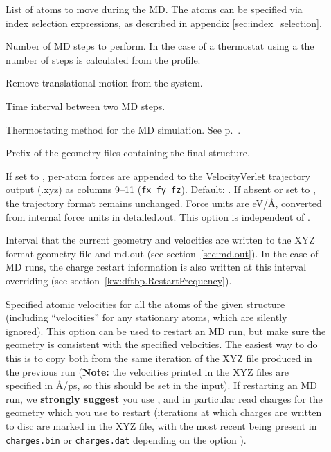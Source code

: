 \begin{description}
\item[] List of atoms to move during the MD. The atoms can be specified via index
selection expressions, as described in appendix \ref{sec:index_selection}.

\item[] Number of MD steps to perform. In the case of a
  thermostat using a  the number of steps is
  calculated from the profile.

\item[] Remove translational motion from the system.


\item[] Time interval between two
  MD steps.

\item[] Thermostating method for the MD simulation. See
  p.~.

\item[] Prefix of the geometry files containing the
  final structure.

\item[] If set to , per-atom forces are
  appended to the VelocityVerlet trajectory output (.xyz) as
  columns 9--11 (\verb|fx fy fz|). Default: . If absent or set to
  , the trajectory format remains unchanged. Force units are
  eV/\AA, converted from internal force units in detailed.out. This option is independent of
  .

\item[] Interval that the current geometry and
  velocities are written to the XYZ format geometry file and md.out
  (see section~\ref{sec:md.out}). In the case of  MD runs, the
  charge restart information is also written at this interval
  overriding  (see
  section~\ref{kw:dftbp.RestartFrequency}).

\item[] Specified atomic velocities for
  all the atoms of the given structure (including ``velocities'' for any
  stationary atoms, which are silently ignored). This option can be used to
  restart an MD run, but make sure the geometry is consistent with the specified
  velocities. The easiest way to do this is to copy both from the same iteration
  of the XYZ file produced in the previous run (\textbf{Note:} the velocities
  printed in the XYZ files are specified in {\AA}/ps, so this should be set in
  the input). If restarting an  MD run, we \textbf{strongly suggest} you
  use , and in particular read charges for the geometry
  which you use to restart (iterations at which charges are written to disc are
  marked in the XYZ file, with the most recent being present in
  \verb|charges.bin| or \verb|charges.dat| depending on the option
  ).


\end{description}
